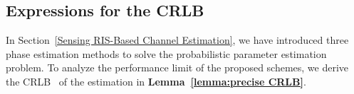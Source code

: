 \documentclass[journal,twocolumn]{IEEEtran}
\theoremstyle{nonumberplain}
\begin{document}
%
%
    
\subsection{Expressions for the CRLB} \label{Precise CRLB}
In Section~\ref{Sensing RIS-Based Channel Estimation}, we have introduced three phase estimation methods to solve the probabilistic parameter estimation problem.
To analyze the performance limit of the proposed schemes, we derive the CRLB~\cite{casella2021statistical} of the estimation in \textbf{Lemma~\ref{lemma:precise CRLB}}.
    
\end{document}
